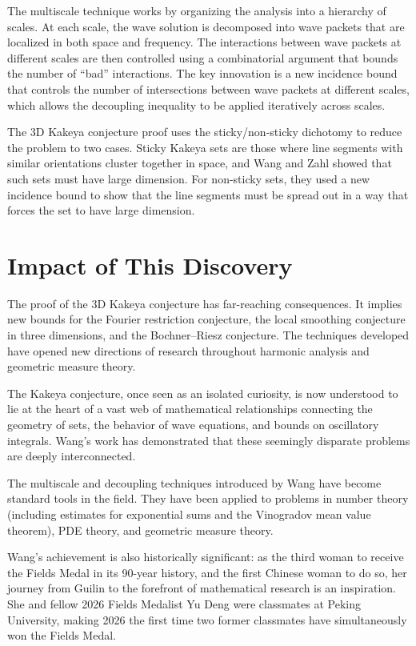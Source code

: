 The multiscale technique works by organizing the analysis into a hierarchy of scales. At each scale, the wave solution is decomposed into wave packets that are localized in both space and frequency. The interactions between wave packets at different scales are then controlled using a combinatorial argument that bounds the number of ``bad'' interactions. The key innovation is a new incidence bound that controls the number of intersections between wave packets at different scales, which allows the decoupling inequality to be applied iteratively across scales.

The 3D Kakeya conjecture proof uses the sticky/non-sticky dichotomy to reduce the problem to two cases. Sticky Kakeya sets are those where line segments with similar orientations cluster together in space, and Wang and Zahl showed that such sets must have large dimension. For non-sticky sets, they used a new incidence bound to show that the line segments must be spread out in a way that forces the set to have large dimension.

\section{Impact of This Discovery}

The proof of the 3D Kakeya conjecture has far-reaching consequences. It implies new bounds for the Fourier restriction conjecture, the local smoothing conjecture in three dimensions, and the Bochner--Riesz conjecture. The techniques developed have opened new directions of research throughout harmonic analysis and geometric measure theory.

The Kakeya conjecture, once seen as an isolated curiosity, is now understood to lie at the heart of a vast web of mathematical relationships connecting the geometry of sets, the behavior of wave equations, and bounds on oscillatory integrals. Wang's work has demonstrated that these seemingly disparate problems are deeply interconnected.

The multiscale and decoupling techniques introduced by Wang have become standard tools in the field. They have been applied to problems in number theory (including estimates for exponential sums and the Vinogradov mean value theorem), PDE theory, and geometric measure theory.

Wang's achievement is also historically significant: as the third woman to receive the Fields Medal in its 90-year history, and the first Chinese woman to do so, her journey from Guilin to the forefront of mathematical research is an inspiration. She and fellow 2026 Fields Medalist Yu Deng were classmates at Peking University, making 2026 the first time two former classmates have simultaneously won the Fields Medal.

